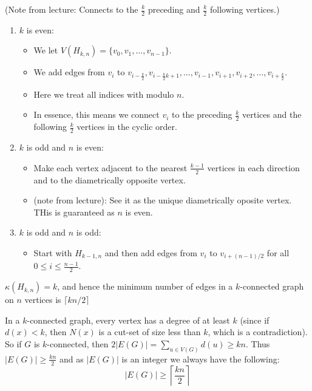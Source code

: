 (Note from lecture: Connects to the $\frac{k}{2}$ preceding and $\frac{k}{2}$ following vertices.)
\begin{enumerate}
	\item $k$ is even:
	      \begin{itemize}
		      \item We let $V(H_{k,n}) = \{v_{0}, v_{1}, \ldots, v_{n-1}\}$.
		      \item We add edges from $v_{i}$ to $v_{i-\frac{k}{2}}, v_{i-\frac{k}{2}k+1}, \ldots, v_{i-1}, v_{i+1}, v_{i+2}, \ldots, v_{i+\frac{k}{2}}$.
		      \item Here we treat all indices with modulo $n$.
		      \item In essence, this means we connect $v_{i}$ to the preceding $\frac{k}{2}$ vertices and the following $\frac{k}{2}$ vertices in the cyclic order.
	      \end{itemize}
	\item $k$ is odd and $n$ is even:
	      \begin{itemize}
		      \item Make each vertex adjacent to the nearest $\frac{k-1}{2}$ vertices in each direction and to the diametrically opposite vertex.
		      \item (note from lecture): See it as the unique diametrically oposite vertex. THis is guaranteed as $n$ is even.
	      \end{itemize}
	\item $k$ is odd and $n$ is odd:
	      \begin{itemize}
		      \item Start with $H_{k-1,n}$ and then add edges from $v_{i}$ to $v_{i+(n-1)/2}$ for all $0 \le i \le \frac{n-1}{2}$.
	      \end{itemize}
\end{enumerate}

\begin{theorem}[Harary, 1962]
	\(\kappa(H_{k,n}) = k \), and hence the minimum number of edges in a $k$-connected graph on $n$ vertices is $\lceil kn / 2 \rceil$
\end{theorem}

In a $k$-connected graph, every vertex has a degree of at least $k$ (since if $d(x) < k$, then $N(x)$ is a cut-set of size less than $k$, which is a contradiction). So if $G$ is $k$-connected, then $2|E(G)| = \sum_{u \in V(G)} d(u) \ge kn$. Thus $|E(G)|\ge \frac{kn}{2}$ and as $|E(G)|$ is an integer we always have the following:
\begin{equation*}
	|E(G)| \ge \left \lceil \frac{kn}{2}  \right \rceil
\end{equation*}

